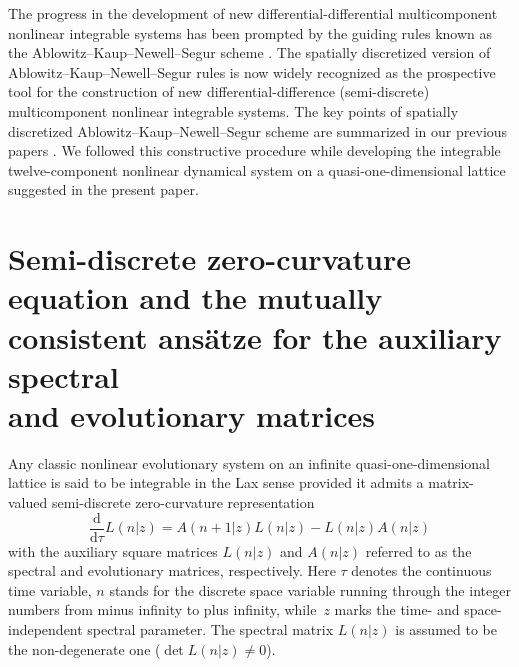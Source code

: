 \documentclass[10pt,a4paper]{amsart}
\numberwithin{equation}{section}
\begin{document}
The progress in the development of new differential-differential multicomponent nonlinear integrable systems has been prompted by the guiding rules known as the Ablowitz--Kaup--Newell--Segur scheme \cite{ablowitz-PRL-31-125, ablowitz-SAM-53-249}. The spatially discretized version of Ablowitz--Kaup--Newell--Segur rules is now widely recognized as the prospective tool for the construction of new differential-difference (semi-discrete) multicomponent nonlinear integrable systems. The key points of spatially discretized Ablowitz--Kaup--Newell--Segur scheme are summarized in our previous papers \cite{vakhnenko-UJP-69-168, vakhnenko-UJP-69-577}. We followed this constructive procedure while developing the integrable twelve-component nonlinear dynamical system on a quasi-one-dimensional lattice suggested in the present paper.


\section[Semi-discrete zero-curvature equation and the mutually consistent ans\"{a}tze for the auxiliary spectral and evolutionary matrices]{Semi-discrete zero-curvature equation and the mutually\\ consistent ans\"{a}tze for the auxiliary spectral\\ and evolutionary matrices}


Any classic nonlinear evolutionary system on an infinite quasi-one-dimensional lattice is said to be integrable in the Lax sense provided it admits a matrix-valued semi-discrete zero-curvature representation \cite{faddeev-HMTS-2007, tu-JPA-23-3903}
\begin{equation}\label{eq-2.1}
	\frac{\mathrm{d}}{\mathrm{d}\tau}L(n|z)=A(n+1|z)L(n|z)-L(n|z)A(n|z)
\end{equation}
with the auxiliary square matrices $L(n|z)$ and $A(n|z)$ referred to as the spectral and evolutionary matrices, respectively.
Here $\tau$ denotes the continuous time variable, $n$ stands for the discrete space variable running through the integer numbers from minus infinity to plus infinity, while~$z$ marks the time- and space-independent spectral parameter. The spectral matrix $L(n|z)$ is assumed to be the non-degenerate one ($\det L(n|z)\neq0$).
\end{document}

